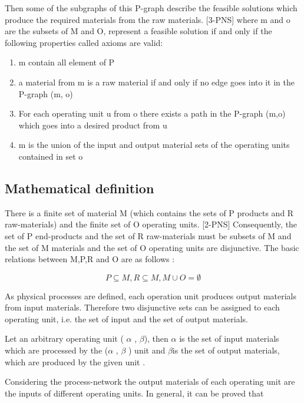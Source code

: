 Then some of the subgraphs of this P-graph describe the feasible solutions which produce the required materials from the raw materials.   [3-PNS]
where m and o are the subsets of M and O, represent a feasible solution if and only if the following properties called axioms are valid: 
\begin{enumerate}

\item m contain all element of P    
\item a material from m is a raw material if and only if no edge goes into it in the P-graph (m, o)  
\item For each operating unit u from o there exists a path in the P-graph (m,o) which goes into a desired product from u  
\item m is the union of the input and output material sets of the operating units contained 
in set o  
 
\end{enumerate}

\subsection{Mathematical definition }

There is a finite set of material M (which contains the sets of P products and R raw-materials) 
and the finite set of O operating units. [2-PNS] 
Consequently, the set of P end-products and the set of R raw-materials must be subsets of M 
and the set of M materials and the set of O operating units are disjunctive.
The basic relations between M,P,R and O are as follows : 

\begin{equation}
P\subseteq M,R\subseteq M,M\cup O=\emptyset\label{eq:1}
\end{equation}

As physical processes are defined, each operation unit produces output materials from
input materials. Therefore two disjunctive sets can be assigned to each operating unit, i.e. the set of input and the set of output materials. 

Let an arbitrary operating unit ( $\alpha$ , $\beta$), then $\alpha$ is the set of input materials which are processed by the 
($\alpha$ , $\beta$ ) unit and $\beta$is the set of output materials, which are produced by the given unit .


Considering the process-network the output materials of each operating unit are the inputs of different operating units. In general, it can be proved that 

